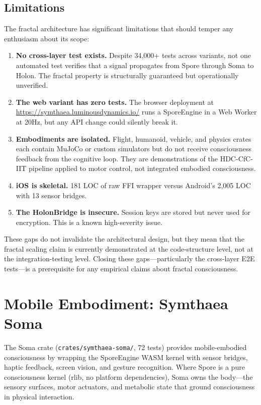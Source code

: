 \documentclass[12pt]{book}
\begin{document}
\section{Limitations}

The fractal architecture has significant limitations that should temper any enthusiasm about its scope:

\begin{enumerate}
  \item \textbf{No cross-layer test exists.} Despite 34,000+ tests across variants, not one automated test verifies that a signal propagates from Spore through Soma to Holon. The fractal property is structurally guaranteed but operationally unverified.
  \item \textbf{The web variant has zero tests.} The browser deployment at \url{https://symthaea.luminousdynamics.io/} runs a SporeEngine in a Web Worker at 20Hz, but any API change could silently break it.
  \item \textbf{Embodiments are isolated.} Flight, humanoid, vehicle, and physics crates each contain MuJoCo or custom simulators but do not receive consciousness feedback from the cognitive loop. They are demonstrations of the HDC-CfC-IIT pipeline applied to motor control, not integrated embodied consciousness.
  \item \textbf{iOS is skeletal.} 181 LOC of raw FFI wrapper versus Android's 2,005 LOC with 13 sensor bridges.
  \item \textbf{The HolonBridge is insecure.} Session keys are stored but never used for encryption. This is a known high-severity issue.
\end{enumerate}

These gaps do not invalidate the architectural design, but they mean that the fractal scaling claim is currently demonstrated at the code-structure level, not at the integration-testing level. Closing these gaps---particularly the cross-layer E2E tests---is a prerequisite for any empirical claims about fractal consciousness.


\chapter{Mobile Embodiment: Symthaea Soma}
\label{ch:soma}

The Soma crate (\texttt{crates/symthaea-soma/}, 72 tests) provides mobile-embodied consciousness by wrapping the SporeEngine WASM kernel with sensor bridges, haptic feedback, screen vision, and gesture recognition. Where Spore is a pure consciousness kernel (rlib, no platform dependencies), Soma owns the body---the sensory surfaces, motor actuators, and metabolic state that ground consciousness in physical interaction.
\end{document}
